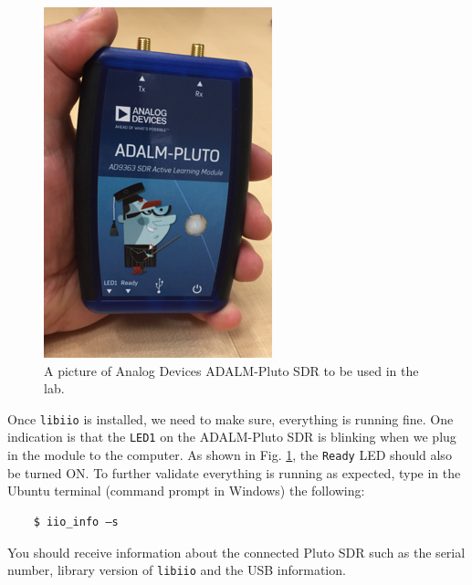 \documentclass[11pt]{article}
\begin{document}
\begin{figure}
  \centering
  \includegraphics[width=.75\linewidth]{pluto_in_hand.png}
  \caption{A picture of Analog Devices ADALM-Pluto SDR to be used in the lab.}
  \label{fig:SDR_pluto}
  \end{figure}
 

Once \texttt{libiio} is installed, we need to make sure, everything is running fine. One indication is that the \texttt{LED1} on the ADALM-Pluto SDR is blinking when we plug in the module to the computer. As shown in Fig. \ref{fig:SDR_pluto}, the \texttt{Ready} LED should also be turned ON. To further validate everything is running as expected, type in the Ubuntu terminal (command prompt in Windows) the following:

\begin{mdframed}[backgroundcolor=gray!20]
  \tiny
  \begin{verbatim}
    $ iio_info –s
  \end{verbatim}
\end{mdframed}

You should receive information about the connected Pluto SDR such as the serial number, library version of \texttt{libiio} and the USB information.
\end{document}
